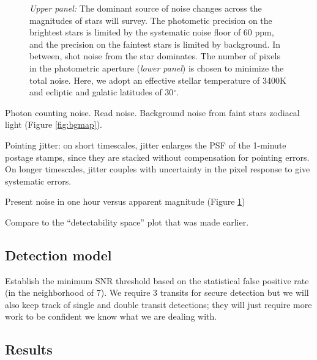 \documentclass{emulateapj}
\begin{document}
\begin{figure*}[ht]
\caption{We model the zodiacal light as a function of eclipic coordinates (\textit{upper left}) and the background stellar flux as a function of galactic coordinates (\textit{upper right}). The lower panels show the combined surface brightness.}
\label{fig:bgmap}
\end{figure*}

\begin{figure}[ht]
\caption{\textit{Upper panel:} The dominant source of noise changes across the magnitudes of stars \tess will survey. The photometic precision on the brightest stars is limited by the systematic noise floor of 60 ppm, and the precision on the faintest stars is limited by background. In between, shot noise from the star dominates. The number of pixels in the photometric aperture (\textit{lower panel}) is chosen to minimize the total noise. Here, we adopt an effective stellar temperature of 3400K and ecliptic and galatic latitudes of 30$^{\circ}$.}
\label{fig:noise}
\end{figure}

Photon counting noise. 
Read noise. 
Background noise from faint stars zodiacal
light (Figure \ref{fig:bgmap}).

Pointing jitter: on short timescales, jitter enlarges the PSF of the 1-minute postage stamps, since they are stacked without compensation for pointing errors. On longer timescales, jitter couples with uncertainty in the pixel response to give systematic errors.

Present noise in one hour versus apparent magnitude (Figure \ref{fig:noise})

Compare to the ``detectability space'' plot that
was made earlier.

\subsection{Detection model}

Establish the minimum SNR threshold based on the statistical false
positive rate (in the neighborhood of 7). We require 3 transits for
secure detection but we will also keep track of single and double
transit detections; they will just require more work to be confident
we know what we are dealing with.

\subsection{Results}
\end{document}

